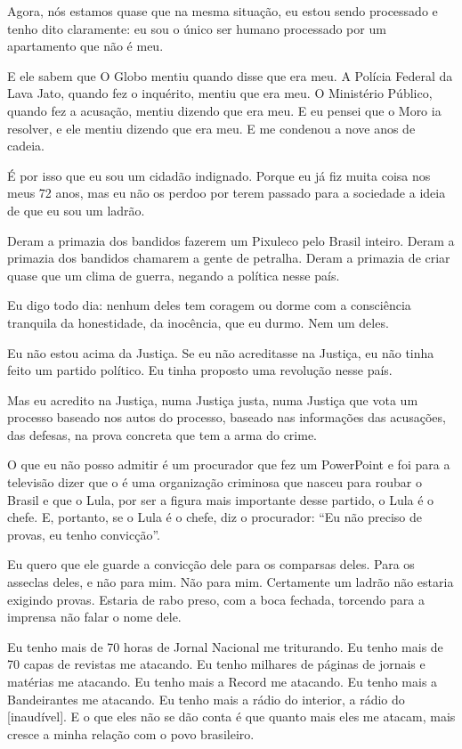 Agora, nós estamos quase que na mesma situação, eu estou sendo
processado e tenho dito claramente: eu
sou o único ser humano processado por um apartamento que não é
meu.

E ele sabem que O Globo mentiu quando disse que era meu. A Polícia
Federal da Lava Jato, quando fez o inquérito, mentiu que era meu. O
Ministério Público, quando fez a acusação, mentiu dizendo que era meu. E
eu pensei que o Moro ia resolver, e ele mentiu dizendo que era meu. E me
condenou a nove anos de cadeia.

É por isso que eu sou um cidadão indignado. Porque eu já fiz muita
coisa nos meus 72 anos, mas eu não os perdoo por terem passado para a
sociedade a ideia de que eu sou um ladrão.

Deram a primazia dos bandidos fazerem um Pixuleco pelo Brasil
inteiro. Deram a primazia dos bandidos chamarem a gente de petralha.
Deram a primazia de criar quase que um clima de guerra, negando a
política nesse país.

Eu digo todo dia: nenhum deles tem coragem ou dorme com a
consciência tranquila da honestidade, da inocência, que eu durmo. Nem um
deles.

Eu não estou acima da Justiça. Se eu não acreditasse na Justiça,
eu não tinha feito um partido político. Eu tinha proposto uma revolução
nesse país.

Mas eu acredito na Justiça, numa Justiça justa, numa Justiça que
vota um processo baseado nos autos do processo, baseado nas informações
das acusações, das defesas, na prova concreta que tem a arma do crime.

O que eu não posso admitir é um procurador que fez um PowerPoint e
foi para a televisão dizer que o  é uma organização criminosa que
nasceu para roubar o Brasil e que o Lula, por ser a figura mais
importante desse partido, o Lula é o chefe. E, portanto, se o Lula é o
chefe, diz o procurador: ``Eu não preciso de provas, eu tenho
convicção''.

Eu quero que ele guarde a convicção dele para os comparsas deles.
Para os asseclas deles, e não para mim. Não para mim. Certamente um
ladrão não estaria exigindo provas. Estaria de rabo preso, com a boca
fechada, torcendo para a imprensa não falar o nome dele.

Eu tenho mais de 70 horas de Jornal Nacional me triturando. Eu
tenho mais de 70 capas de revistas me atacando. Eu tenho
milhares de páginas de jornais e matérias me atacando. Eu tenho mais a
Record me atacando. Eu tenho mais a Bandeirantes me atacando. Eu tenho
mais a rádio do interior, a rádio do [inaudível]. E o que eles não
se dão conta é que quanto mais eles me atacam, mais cresce a minha
relação com o povo brasileiro.

